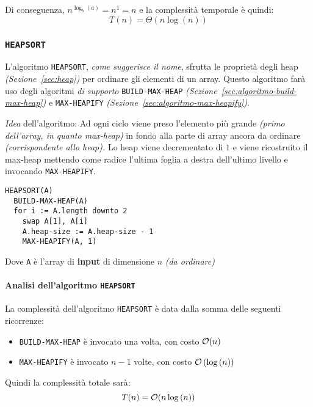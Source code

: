 \documentclass[italian, 10pt]{article}
\begin{document}
Di conseguenza, \(n^{\log_b(a)} = n^1 = n\) e la complessità temporale è quindi:
\[ T(n) = \Theta(n \log{(n)}) \]

\subsubsection{\texttt{HEAPSORT}}
\label{sec:heap-sort}

L'algoritmo \texttt{HEAPSORT}, \textit{come suggerisce il nome}, sfrutta le proprietà degli heap \textit{(Sezione~\ref{sec:heap})} per ordinare gli elementi di un array.
Questo algoritmo farà uso degli algoritmi \textit{di supporto} \texttt{BUILD-MAX-HEAP} \textit{(Sezione~\ref{sec:algoritmo-build-max-heap})} e \texttt{MAX-HEAPIFY} \textit{(Sezione~\ref{sec:algoritmo-max-heapify})}.

\textit{Idea} dell'algoritmo:
Ad ogni ciclo viene preso l'elemento più grande \textit{(primo dell'array, in quanto max-heap)} in fondo alla parte di array ancora da ordinare \textit{(corrispondente allo heap).}
Lo heap viene decrementato di \(1\) e viene ricostruito il max-heap mettendo come radice l'ultima foglia a destra dell'ultimo livello e invocando \texttt{MAX-HEAPIFY}.

\begin{lstlisting}[style=pseudocode, float, caption={Pseudocodice dell'algoritmo \texttt{HEAPSORT}}, label={sec:algoritmo-heapsort}]
HEAPSORT(A)
  BUILD-MAX-HEAP(A)
  for i := A.length downto 2
    swap A[1], A[i]
    A.heap-size := A.heap-size - 1
    MAX-HEAPIFY(A, 1)
\end{lstlisting}

Dove \texttt{A} è l'array di \textbf{input} di dimensione \(n\) \textit{(da ordinare)}

\paragraph{Analisi dell'algoritmo \texttt{HEAPSORT}}

La complessità dell'algoritmo \texttt{HEAPSORT} è data dalla somma delle seguenti ricorrenze:

\begin{itemize}
  \item \texttt{BUILD-MAX-HEAP} è invocato una volta, con costo \(\mathcal{O}(n)\)
  \item \texttt{MAX-HEAPIFY} è invocato \(n-1\) volte, con costo \(\mathcal{O}\left(\log{(n)}\right)\)
\end{itemize}

Quindi la complessità totale sarà:
\[ T(n) = \mathcal{O} (n \log{(n)}) \]
\end{document}
